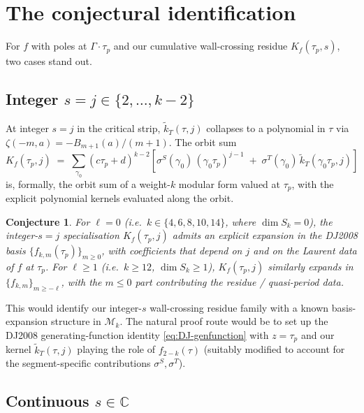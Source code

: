 \documentclass[11pt]{article}
\newtheorem{conjecture}[theorem]{Conjecture}
\newcommand{\CC}{\mathbb{C}}
\begin{document}
\section{The conjectural identification}

For $f$ with poles at $\Gamma\cdot\tau_p$ and our cumulative
wall-crossing residue $K_f(\tau_p, s)$, two cases stand out.

\subsection{Integer $s = j \in \{2, \ldots, k - 2\}$}

At integer $s = j$ in the critical strip, $\widetilde{k}_T(\tau, j)$
collapses to a polynomial in $\tau$ via $\zeta(-m, a) =
-B_{m+1}(a)/(m+1)$.  The orbit sum
\begin{equation}\label{eq:Kf-integer-s}
  K_f(\tau_p, j) \;=\; \sum_{\gamma_0}\!(c\tau_p + d)^{k - 2}\!
  \left[\sigma^S(\gamma_0)\,(\gamma_0\tau_p)^{j - 1}
  \;+\; \sigma^T(\gamma_0)\,\widetilde{k}_T(\gamma_0\tau_p, j)\right]
\end{equation}
is, formally, the orbit sum of a weight-$k$ modular form valued at
$\tau_p$, with the explicit polynomial kernels evaluated along the
orbit.

\begin{conjecture}\label{conj:DJ-decomposition}
For $\ell = 0$ (i.e.\ $k \in \{4, 6, 8, 10, 14\}$, where $\dim S_k =
0$), the integer-$s = j$ specialisation $K_f(\tau_p, j)$ admits an
explicit expansion in the DJ2008 basis $\{f_{k, m}(\tau_p)\}_{m \ge
0}$, with coefficients that depend on $j$ and on the Laurent data of
$f$ at $\tau_p$.  For $\ell \ge 1$ (i.e.\ $k \ge 12$, $\dim S_k \ge 1$),
$K_f(\tau_p, j)$ similarly expands in $\{f_{k, m}\}_{m \ge -\ell}$,
with the $m \le 0$ part contributing the residue / quasi-period data.
\end{conjecture}

This would identify our integer-$s$ wall-crossing residue family with
a known basis-expansion structure in $\mathcal{M}_k$.  The natural
proof route would be to set up the DJ2008 generating-function
identity \eqref{eq:DJ-genfunction} with $z = \tau_p$ and our kernel
$\widetilde{k}_T(\tau, j)$ playing the role of $f_{2-k}(\tau)$
(suitably modified to account for the segment-specific contributions
$\sigma^S, \sigma^T$).

\subsection{Continuous $s \in \CC$}
\end{document}
